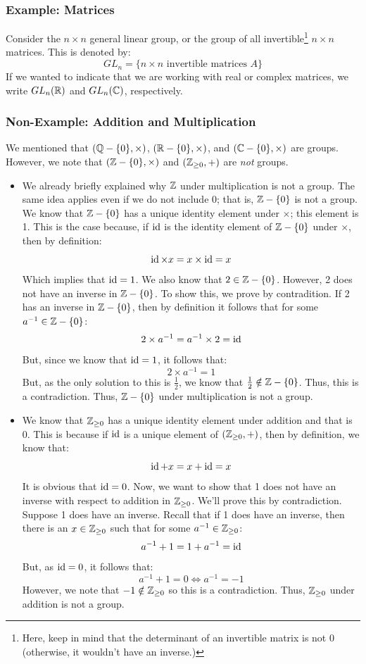 \documentclass[letterpaper]{article}
\begin{document}
\subsubsection{Example: Matrices}
Consider the $n \times n$ general linear group, or the group of all invertible\footnote{Here, keep in mind that the determinant of an invertible matrix is not 0 (otherwise, it wouldn't have an inverse.)} $n \times n$ matrices. This is denoted by: 
\[GL_n = \{n \times n \text{ invertible matrices } A\}\]
If we wanted to indicate that we are working with real or complex matrices, we write $GL_{n}(\mathbb{R})$ and $GL_{n}(\mathbb{C})$, respectively.

\subsubsection{Non-Example: Addition and Multiplication}
We mentioned that $(\mathbb{Q} - \{0\}, \times)$, $(\mathbb{R} - \{0\}, \times)$, and $(\mathbb{C} - \{0\}, \times)$ are groups. However, we note that $(\mathbb{Z} - \{0\}, \times)$ and $(\mathbb{Z}_{\geq 0}, +)$ are \emph{not} groups. 
\begin{itemize}
    \item We already briefly explained why $\mathbb{Z}$ under multiplication is not a group. The same idea applies even if we do not include 0; that is, $\mathbb{Z} - \{0\}$ is not a group. We know that $\mathbb{Z} - \{0\}$ has a unique identity element under $\times$; this element is 1. This is the case because, if $\operatorname{id}$ is the identity element of $\mathbb{Z} - \{0\}$ under $\times$, then by definition: 
    \[\operatorname{id} \times x = x \times \operatorname{id} = x\]
    Which implies that $\operatorname{id} = 1$. We also know that $2 \in \mathbb{Z} - \{0\}$. However, 2 does not have an inverse in $\mathbb{Z} - \{0\}$. To show this, we prove by contradition. If 2 has an inverse in $\mathbb{Z} - \{0\}$, then by definition it follows that for some $a^{-1} \in \mathbb{Z} - \{0\}$:
    \[2 \times a^{-1} = a^{-1} \times 2 = \operatorname{id}\]
    But, since we know that $\operatorname{id} = 1$, it follows that:
    \[2 \times a^{-1}= 1\]
    But, as the only solution to this is $\frac{1}{2}$, we know that $\frac{1}{2} \notin \mathbb{Z} - \{0\}$. Thus, this is a contradiction. Thus, $\mathbb{Z} - \{0\}$ under multiplication is not a group. 

    \item We know that $\mathbb{Z}_{\geq 0}$ has a unique identity element under addition and that is 0. This is because if $\operatorname{id}$ is a unique element of $(\mathbb{Z}_{\geq 0}, +)$, then by definition, we know that: 
    \[\operatorname{id} + x = x + \operatorname{id} = x\]
    It is obvious that $\operatorname{id} = 0$. Now, we want to show that 1 does not have an inverse with respect to addition in $\mathbb{Z}_{\geq 0}$. We'll prove this by contradiction. Suppose 1 does have an inverse. Recall that if 1 does have an inverse, then there is an $x \in \mathbb{Z}_{\geq 0}$ such that for some $a^{-1} \in \mathbb{Z}_{\geq 0}$:
    \[a^{-1} + 1 = 1 + a^{-1} = \operatorname{id}\]
    But, as $\operatorname{id} = 0$, it follows that: 
    \[a^{-1} + 1 = 0 \iff a^{-1} = -1\]
    However, we note that $-1 \notin \mathbb{Z}_{\geq 0}$ so this is a contradiction. Thus, $\mathbb{Z}_{\geq 0}$ under addition is not a group.
\end{itemize}
\end{document}
